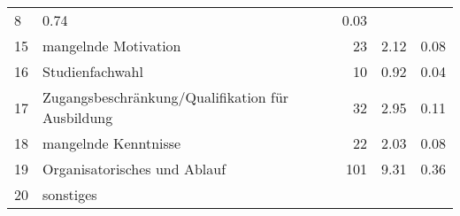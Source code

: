 \begin{longtable}{lXrrr}
       \num{8} &
       \num[round-mode=places,round-precision=2]{0.74} &
         \num[round-mode=places,round-precision=2]{0.03} \\

     15 &
     \multicolumn{1}{X}{ mangelnde Motivation   } &


       \num{23} &
       \num[round-mode=places,round-precision=2]{2.12} &
         \num[round-mode=places,round-precision=2]{0.08} \\

     16 &
     \multicolumn{1}{X}{ Studienfachwahl   } &


       \num{10} &
       \num[round-mode=places,round-precision=2]{0.92} &
         \num[round-mode=places,round-precision=2]{0.04} \\

     17 &
     \multicolumn{1}{X}{ Zugangsbeschränkung/Qualifikation für Ausbildung   } &


       \num{32} &
       \num[round-mode=places,round-precision=2]{2.95} &
         \num[round-mode=places,round-precision=2]{0.11} \\

     18 &
     \multicolumn{1}{X}{ mangelnde Kenntnisse   } &


       \num{22} &
       \num[round-mode=places,round-precision=2]{2.03} &
         \num[round-mode=places,round-precision=2]{0.08} \\

     19 &
     \multicolumn{1}{X}{ Organisatorisches und Ablauf   } &


       \num{101} &
       \num[round-mode=places,round-precision=2]{9.31} &
         \num[round-mode=places,round-precision=2]{0.36} \\

     20 &
     \multicolumn{1}{X}{ sonstiges   } &



\end{longtable}
